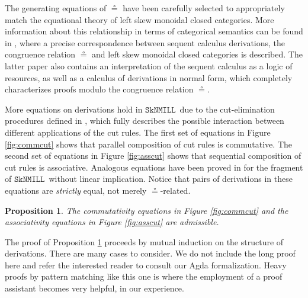 \documentclass[sn-mathphys-num]{sn-jnl}%
\newcommand{\SkNMILL}{$\mathtt{SkNMILL}$}
\newcommand{\niccolo}[1]{\textcolor{red}{NV: #1}}
\theoremstyle{thmstyleone}%
\newtheorem{proposition}[theorem]{Proposition}%
\theoremstyle{thmstyletwo}%
\theoremstyle{thmstylethree}%
\begin{document}
The generating equations of $\circeq$ have been carefully selected to appropriately match the equational theory of left skew monoidal closed categories. More information about this relationship in terms of categorical semantics can be found in \cite{UVW:protsn}, where a precise correspondence between sequent calculus derivations, the congruence relation $\circeq$ and left skew monoidal closed categories is described.
The latter paper also contains an interpretation of the sequent calculus as a logic of resources, as well as a calculus of derivations in normal form, which completely characterizes proofs modulo the congruence relation $\circeq$.

More equations on derivations hold in \SkNMILL~due to the cut-elimination procedures defined in \cite{UVW:protsn,wan2024},
which fully describes the possible interaction between different applications of the cut rules. The first set of equations in Figure \ref{fig:commcut} shows that parallel composition of cut rules is commutative. The second set of equations in Figure \ref{fig:asscut} shows that sequential composition of cut rules is associative.
Analogous equations have been proved in \cite{uustalu:sequent:2021} for the fragment of \SkNMILL~without linear implication.
Notice that pairs of derivations in these equations are \emph{strictly} equal, not merely $\circeq$-related.

\begin{proposition}\label{prop:cut}
  The commutativity equations in Figure \ref{fig:commcut} and the associativity equations in Figure \ref{fig:asscut} are admissible.
\end{proposition}

The proof of Proposition \ref{prop:cut} proceeds by mutual induction on the structure of derivations.
  There are many cases to consider. We do not include the long proof here and refer the interested reader to consult our Agda formalization. Heavy proofs by pattern matching like this one is where the employment of a proof assistant becomes very helpful, in our experience.
\end{document}
